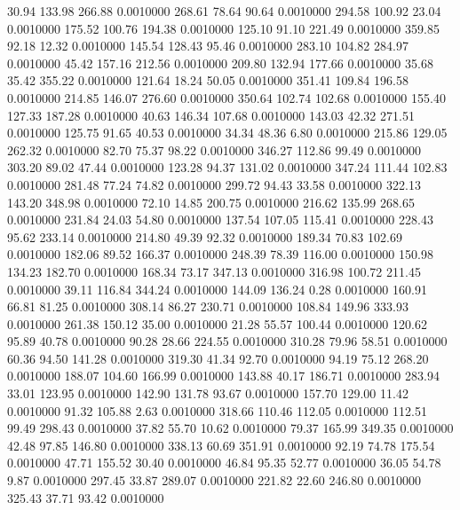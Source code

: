   30.94  133.98  266.88   0.0010000
 268.61   78.64   90.64   0.0010000
 294.58  100.92   23.04   0.0010000
 175.52  100.76  194.38   0.0010000
 125.10   91.10  221.49   0.0010000
 359.85   92.18   12.32   0.0010000
 145.54  128.43   95.46   0.0010000
 283.10  104.82  284.97   0.0010000
  45.42  157.16  212.56   0.0010000
 209.80  132.94  177.66   0.0010000
  35.68   35.42  355.22   0.0010000
 121.64   18.24   50.05   0.0010000
 351.41  109.84  196.58   0.0010000
 214.85  146.07  276.60   0.0010000
 350.64  102.74  102.68   0.0010000
 155.40  127.33  187.28   0.0010000
  40.63  146.34  107.68   0.0010000
 143.03   42.32  271.51   0.0010000
 125.75   91.65   40.53   0.0010000
  34.34   48.36    6.80   0.0010000
 215.86  129.05  262.32   0.0010000
  82.70   75.37   98.22   0.0010000
 346.27  112.86   99.49   0.0010000
 303.20   89.02   47.44   0.0010000
 123.28   94.37  131.02   0.0010000
 347.24  111.44  102.83   0.0010000
 281.48   77.24   74.82   0.0010000
 299.72   94.43   33.58   0.0010000
 322.13  143.20  348.98   0.0010000
  72.10   14.85  200.75   0.0010000
 216.62  135.99  268.65   0.0010000
 231.84   24.03   54.80   0.0010000
 137.54  107.05  115.41   0.0010000
 228.43   95.62  233.14   0.0010000
 214.80   49.39   92.32   0.0010000
 189.34   70.83  102.69   0.0010000
 182.06   89.52  166.37   0.0010000
 248.39   78.39  116.00   0.0010000
 150.98  134.23  182.70   0.0010000
 168.34   73.17  347.13   0.0010000
 316.98  100.72  211.45   0.0010000
  39.11  116.84  344.24   0.0010000
 144.09  136.24    0.28   0.0010000
 160.91   66.81   81.25   0.0010000
 308.14   86.27  230.71   0.0010000
 108.84  149.96  333.93   0.0010000
 261.38  150.12   35.00   0.0010000
  21.28   55.57  100.44   0.0010000
 120.62   95.89   40.78   0.0010000
  90.28   28.66  224.55   0.0010000
 310.28   79.96   58.51   0.0010000
  60.36   94.50  141.28   0.0010000
 319.30   41.34   92.70   0.0010000
  94.19   75.12  268.20   0.0010000
 188.07  104.60  166.99   0.0010000
 143.88   40.17  186.71   0.0010000
 283.94   33.01  123.95   0.0010000
 142.90  131.78   93.67   0.0010000
 157.70  129.00   11.42   0.0010000
  91.32  105.88    2.63   0.0010000
 318.66  110.46  112.05   0.0010000
 112.51   99.49  298.43   0.0010000
  37.82   55.70   10.62   0.0010000
  79.37  165.99  349.35   0.0010000
  42.48   97.85  146.80   0.0010000
 338.13   60.69  351.91   0.0010000
  92.19   74.78  175.54   0.0010000
  47.71  155.52   30.40   0.0010000
  46.84   95.35   52.77   0.0010000
  36.05   54.78    9.87   0.0010000
 297.45   33.87  289.07   0.0010000
 221.82   22.60  246.80   0.0010000
 325.43   37.71   93.42   0.0010000
